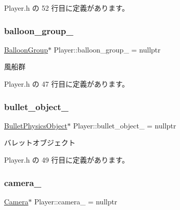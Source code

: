  Player.\+h の 52 行目に定義があります。

\mbox{\label{class_player_ac0e8f407322bde4ee86300624b26eb56}} 
\subsubsection{\texorpdfstring{balloon\+\_\+group\+\_\+}{balloon\_group\_}}
{\footnotesize\ttfamily \mbox{\hyperlink{class_balloon_group}{Balloon\+Group}}$\ast$ Player\+::balloon\+\_\+group\+\_\+ = nullptr\hspace{0.3cm}{\ttfamily [private]}}



風船群 



 Player.\+h の 47 行目に定義があります。

\mbox{\label{class_player_ad2aef02a40527af4f79dc99d652f5e7c}} 
\subsubsection{\texorpdfstring{bullet\+\_\+object\+\_\+}{bullet\_object\_}}
{\footnotesize\ttfamily \mbox{\hyperlink{class_bullet_physics_object}{Bullet\+Physics\+Object}}$\ast$ Player\+::bullet\+\_\+object\+\_\+ = nullptr\hspace{0.3cm}{\ttfamily [private]}}



バレットオブジェクト 



 Player.\+h の 49 行目に定義があります。

\mbox{\label{class_player_aab89171e78f99d2604210055d2f10734}} 
\subsubsection{\texorpdfstring{camera\+\_\+}{camera\_}}
{\footnotesize\ttfamily \mbox{\hyperlink{class_camera}{Camera}}$\ast$ Player\+::camera\+\_\+ = nullptr\hspace{0.3cm}{\ttfamily [private]}}



